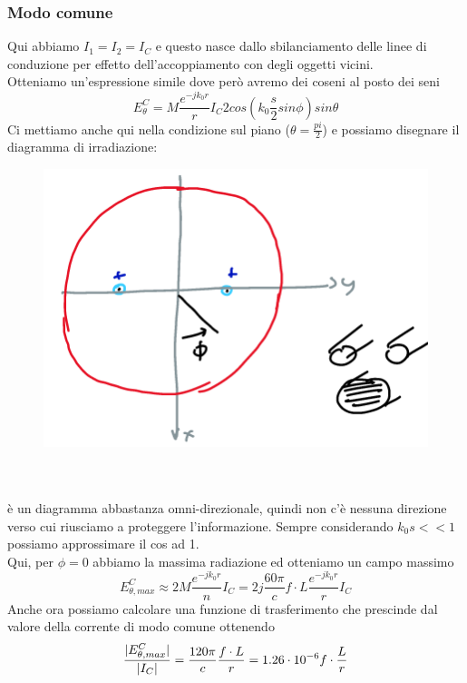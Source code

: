 \documentclass[oneside, 12pt]{extbook}
\DeclarePairedDelimiter{\abs}{\lvert}{\rvert}
\begin{document}
\subsubsection{Modo comune}
Qui abbiamo $I_1 = I_2 = I_C$ e questo nasce dallo sbilanciamento delle linee di conduzione per effetto dell'accoppiamento con degli oggetti vicini.\\Otteniamo un'espressione simile dove però avremo dei coseni al posto dei seni
\begin{equation}
	E_{\theta}^C = M \frac{e^{-jk_0r}}{r}I_C 2 cos(k_0 \frac{s}{2}sin\phi)sin\theta 
\end{equation}
Ci mettiamo anche qui nella condizione sul piano ($\theta = \frac{pi}{2}$) e possiamo disegnare il diagramma di irradiazione:\\ 
\begin{figure}[!h]
	\includegraphics[scale=0.4]{immagini/irrad_modo_comune.png}
\end{figure}
\\\\è un diagramma abbastanza omni-direzionale, quindi non c'è nessuna direzione verso cui riusciamo a proteggere l'informazione. Sempre considerando $k_0 s << 1$ possiamo approssimare il cos ad 1.\\ Qui, per $\phi = 0$ abbiamo la massima radiazione ed otteniamo un campo massimo 
\begin{equation}
	E_{\theta, max}^C \approx 2M \dfrac{e^{-jk_0r}}{n}I_C = 2j \frac{60\pi}{c} f \cdot L \dfrac{e^{-jk_0r}}{r} I_C
\end{equation}
Anche ora possiamo calcolare una funzione di trasferimento che prescinde dal valore della corrente di modo comune ottenendo 
\begin{equation}
	\dfrac{\abs{E_{\theta, max}^C}}{\abs{I_C}} = \frac{120 \pi}{c}\frac{f \cdot L}{r} = 1.26 \cdot 10^{-6} f \cdot \frac{L}{r}	
\end{equation}
\end{document}
